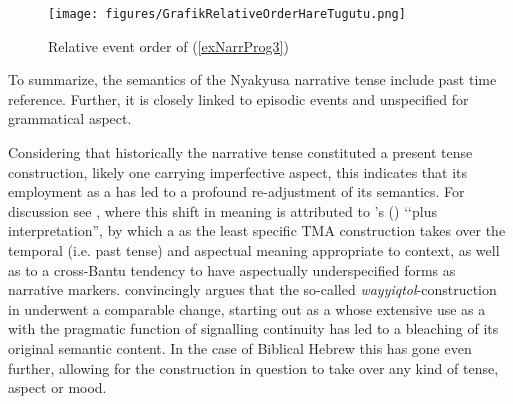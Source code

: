 \begin{figure}[hbt]
	\begin{center}
		\texttt{[image: figures/GrafikRelativeOrderHareTugutu.png]}
		\caption{Relative event order of (\ref{exNarrProg3})}
		\label{FigureRelativeOrderProgressives2}
	\end{center}
\end{figure}

To summarize, the semantics of the Nyakyusa narrative tense include past time reference. Further, it is closely linked to episodic events and unspecified for grammatical aspect.

Considering that historically the narrative tense constituted a present tense construction, likely one carrying imperfective aspect, this indicates that its employment as a  has led to a profound re-adjustment of its semantics. For discussion see \citet{PersohnB2016}, where this shift in meaning is attributed to \citeauthor{FleischmanS1990}'s (\citeyear{FleischmanS1990}) \lq\lq plus interpretation'', by which a  as the least specific TMA construction takes over the temporal (i.e. past tense) and aspectual meaning appropriate to context, as well as to a cross-Bantu tendency to have aspectually underspecified forms as narrative markers. \citet{RobarE2014} convincingly argues that the so-called \textit{wayyiqtol}-construction in  underwent a comparable change, starting out as a  whose extensive use as a  with the pragmatic function of signalling continuity has led to a bleaching of its original semantic content. In the case of Biblical Hebrew this has gone even further, allowing for the construction in question to take over any kind of tense, aspect or mood.
